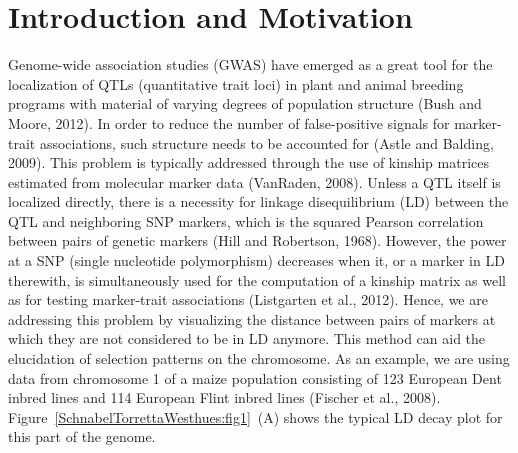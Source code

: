 \documentclass[twoside]{report}
\begin{document}


\section{Introduction and Motivation}

Genome-wide association studies (GWAS) have emerged as a great tool for the 
localization of QTLs (quantitative trait loci) in plant and animal breeding programs 
with material of varying degrees of population structure (Bush and Moore, 2012). 
In order to reduce the number of false-positive signals for marker-trait associations,
such structure needs to be accounted for (Astle and Balding, 2009). This problem is 
typically addressed through 
the use of kinship matrices estimated from molecular marker data (VanRaden, 2008).
Unless a QTL itself is localized directly, there is a necessity for linkage disequilibrium (LD) between
the QTL and neighboring SNP markers, which is the squared Pearson correlation between pairs of genetic
markers (Hill and Robertson, 1968). However, the power at a SNP (single nucleotide polymorphism)
 decreases when it, or a marker in LD therewith,
is simultaneously used for the computation of a kinship matrix as well as for testing marker-trait 
associations (Listgarten et al., 2012). 
Hence, we are addressing this problem by visualizing the distance
between pairs of markers at which they are not considered to be in LD anymore. 
This method can aid 
the elucidation
of selection patterns on the chromosome. As an example, we are using data from chromosome 1 of a maize 
population consisting of 123 European Dent inbred lines and 114 European Flint inbred lines
(Fischer et al., 2008). Figure~\ref{SchnabelTorrettaWesthues:fig1}~(A) shows the typical LD decay plot 
for this part of the genome. 
\end{document}
